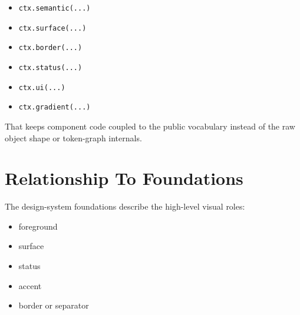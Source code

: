 \begin{itemize}
\tightlist
\item
  \texttt{c\allowbreak{}t\allowbreak{}x\allowbreak{}.\allowbreak{}s\allowbreak{}e\allowbreak{}m\allowbreak{}a\allowbreak{}n\allowbreak{}t\allowbreak{}i\allowbreak{}c\allowbreak{}(\allowbreak{}.\allowbreak{}.\allowbreak{}.\allowbreak{})}
\item
  \texttt{c\allowbreak{}t\allowbreak{}x\allowbreak{}.\allowbreak{}s\allowbreak{}u\allowbreak{}r\allowbreak{}f\allowbreak{}a\allowbreak{}c\allowbreak{}e\allowbreak{}(\allowbreak{}.\allowbreak{}.\allowbreak{}.\allowbreak{})}
\item
  \texttt{c\allowbreak{}t\allowbreak{}x\allowbreak{}.\allowbreak{}b\allowbreak{}o\allowbreak{}r\allowbreak{}d\allowbreak{}e\allowbreak{}r\allowbreak{}(\allowbreak{}.\allowbreak{}.\allowbreak{}.\allowbreak{})}
\item
  \texttt{c\allowbreak{}t\allowbreak{}x\allowbreak{}.\allowbreak{}s\allowbreak{}t\allowbreak{}a\allowbreak{}t\allowbreak{}u\allowbreak{}s\allowbreak{}(\allowbreak{}.\allowbreak{}.\allowbreak{}.\allowbreak{})}
\item
  \texttt{c\allowbreak{}t\allowbreak{}x\allowbreak{}.\allowbreak{}u\allowbreak{}i\allowbreak{}(\allowbreak{}.\allowbreak{}.\allowbreak{}.\allowbreak{})}
\item
  \texttt{c\allowbreak{}t\allowbreak{}x\allowbreak{}.\allowbreak{}g\allowbreak{}r\allowbreak{}a\allowbreak{}d\allowbreak{}i\allowbreak{}e\allowbreak{}n\allowbreak{}t\allowbreak{}(\allowbreak{}.\allowbreak{}.\allowbreak{}.\allowbreak{})}
\end{itemize}

That keeps component code coupled to the public vocabulary instead of the raw object shape or token-graph internals.

\section{Relationship To Foundations}\label{record-028-relationship-to-foundations}

The design-system foundations describe the high-level visual roles:

\begin{itemize}
\tightlist
\item
  foreground
\item
  surface
\item
  status
\item
  accent
\item
  border or separator
\end{itemize}

